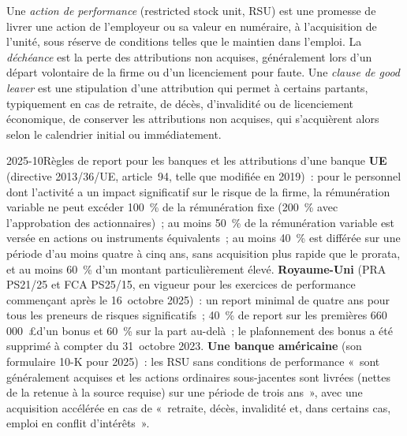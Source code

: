 \begin{definition}\label{def:in:how-pay-works:rsu}
Une \emph{action de performance} (restricted stock unit, RSU) est une promesse de livrer une action de l'employeur
ou sa valeur en numéraire, à l'acquisition de l'unité, sous réserve de conditions telles que le maintien dans l'emploi. La \emph{déchéance}
 est la perte des attributions non acquises, généralement lors d'un départ volontaire de la firme ou d'un licenciement pour faute.
Une \emph{clause de good leaver} est une stipulation d'une attribution qui permet à certains partants, typiquement en cas de retraite,
de décès, d'invalidité ou de licenciement économique, de conserver les attributions non acquises, qui s'acquièrent alors selon le calendrier initial ou immédiatement.
\end{definition}

\begin{dated}{2025-10}{Règles de report pour les banques et les attributions d'une banque}\label{dat:in:how-pay-works:rules}
\textbf{UE} (directive 2013/36/UE, article~94, telle que modifiée en 2019)~: pour le personnel dont l'activité a un impact significatif sur le
risque de la firme, la rémunération variable ne peut excéder 100~\% de la rémunération fixe (200~\% avec l'approbation des actionnaires)~; au moins 50~\% de la rémunération
variable est versée en actions ou instruments équivalents~; au moins 40~\% est différée sur une période d'au moins quatre à cinq ans, sans acquisition plus
rapide que le prorata, et au moins 60~\% d'un montant particulièrement élevé. \textbf{Royaume-Uni} (PRA PS21/25 et FCA PS25/15,
en vigueur pour les exercices de performance commençant après le 16~octobre 2025)~: un report minimal de quatre ans pour tous les preneurs de
risques significatifs~; 40~\% de report sur les premières 660\,000~\pounds d'un bonus et 60~\% sur la part au-delà~; le plafonnement des bonus a été supprimé à compter du 31~octobre 2023.
\textbf{Une banque américaine} (son formulaire 10-K pour 2025)~: les RSU sans conditions de performance «~sont généralement acquises
et les actions ordinaires sous-jacentes sont livrées (nettes de la retenue à la source requise) sur une période de trois ans~»,
avec une acquisition accélérée en cas de «~retraite, décès, invalidité et, dans certains cas, emploi en conflit d'intérêts~».
\end{dated}

